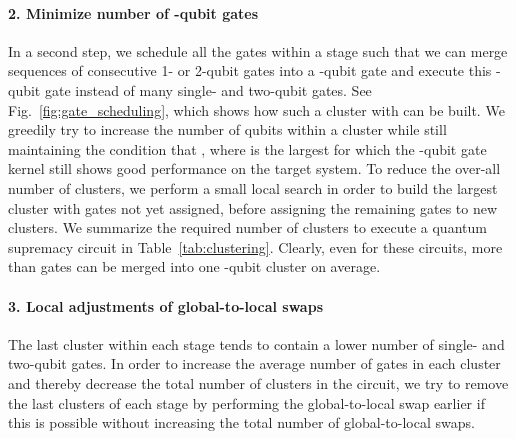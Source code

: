 \documentclass[sigconf]{acmart}
\begin{document}
\paragraph{2. Minimize number of -qubit gates}
In a second step, we schedule all the gates within a stage such that we can merge sequences of consecutive 1- or 2-qubit gates into a -qubit gate and execute this -qubit gate instead of many single- and two-qubit gates. See Fig.~\ref{fig:gate_scheduling}, which shows how such a cluster with  can be built. We greedily try to increase the number of qubits  within a cluster while still maintaining the condition that , where  is the largest  for which the -qubit gate kernel still shows good performance on the target system. To reduce the over-all number of clusters, we perform a small local search in order to build the largest cluster with gates not yet assigned, before assigning the remaining gates to new clusters. We summarize the required number of clusters to execute a quantum supremacy circuit in Table~\ref{tab:clustering}. Clearly, even for these circuits, more than  gates can be merged into one -qubit cluster on average.


\paragraph{3. Local adjustments of global-to-local swaps}
The last cluster within each stage tends to contain a lower number of single- and two-qubit gates. In order to increase the average number of gates in each cluster and thereby decrease the total number of clusters in the circuit, we try to remove the last clusters of each stage by performing the global-to-local swap earlier if this is possible without increasing the total number of global-to-local swaps. 
\end{document}
